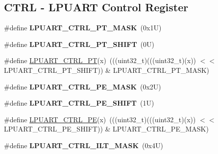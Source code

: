 \subsection*{C\+T\+RL -\/ L\+P\+U\+A\+RT Control Register}
\begin{DoxyCompactItemize}
\item 
\mbox{\label{group___l_p_u_a_r_t___register___masks_gae92aa041b0f242c19f5dff7d21e4fe78}} 
\#define {\bfseries L\+P\+U\+A\+R\+T\+\_\+\+C\+T\+R\+L\+\_\+\+P\+T\+\_\+\+M\+A\+SK}~(0x1\+U)
\item 
\mbox{\label{group___l_p_u_a_r_t___register___masks_ga634d943f64d37a0e0e6d61abd1e1bd5e}} 
\#define {\bfseries L\+P\+U\+A\+R\+T\+\_\+\+C\+T\+R\+L\+\_\+\+P\+T\+\_\+\+S\+H\+I\+FT}~(0\+U)
\item 
\#define \mbox{\hyperlink{group___l_p_u_a_r_t___register___masks_ga830b7bc52d82c855873cafb1c6144393}{L\+P\+U\+A\+R\+T\+\_\+\+C\+T\+R\+L\+\_\+\+PT}}(x)~(((uint32\+\_\+t)(((uint32\+\_\+t)(x)) $<$$<$ L\+P\+U\+A\+R\+T\+\_\+\+C\+T\+R\+L\+\_\+\+P\+T\+\_\+\+S\+H\+I\+FT)) \& L\+P\+U\+A\+R\+T\+\_\+\+C\+T\+R\+L\+\_\+\+P\+T\+\_\+\+M\+A\+SK)
\item 
\mbox{\label{group___l_p_u_a_r_t___register___masks_gac92c20f6273ca56bd3210477b49f1ed6}} 
\#define {\bfseries L\+P\+U\+A\+R\+T\+\_\+\+C\+T\+R\+L\+\_\+\+P\+E\+\_\+\+M\+A\+SK}~(0x2\+U)
\item 
\mbox{\label{group___l_p_u_a_r_t___register___masks_ga7f73fc8acf575be698faffe0bff4ac11}} 
\#define {\bfseries L\+P\+U\+A\+R\+T\+\_\+\+C\+T\+R\+L\+\_\+\+P\+E\+\_\+\+S\+H\+I\+FT}~(1\+U)
\item 
\#define \mbox{\hyperlink{group___l_p_u_a_r_t___register___masks_ga2682b851ce14fcd9d186926a5e857db4}{L\+P\+U\+A\+R\+T\+\_\+\+C\+T\+R\+L\+\_\+\+PE}}(x)~(((uint32\+\_\+t)(((uint32\+\_\+t)(x)) $<$$<$ L\+P\+U\+A\+R\+T\+\_\+\+C\+T\+R\+L\+\_\+\+P\+E\+\_\+\+S\+H\+I\+FT)) \& L\+P\+U\+A\+R\+T\+\_\+\+C\+T\+R\+L\+\_\+\+P\+E\+\_\+\+M\+A\+SK)
\item 
\mbox{\label{group___l_p_u_a_r_t___register___masks_ga6b2188d8cb1594d66d1c3982756949f1}} 
\#define {\bfseries L\+P\+U\+A\+R\+T\+\_\+\+C\+T\+R\+L\+\_\+\+I\+L\+T\+\_\+\+M\+A\+SK}~(0x4\+U)

\end{DoxyCompactItemize}
